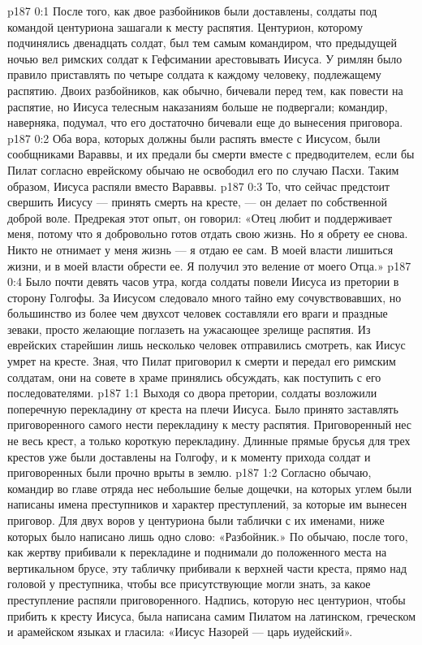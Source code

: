 \author{Комиссия срединников}
\vs p187 0:1 После того, как двое разбойников были доставлены, солдаты под командой центуриона зашагали к месту распятия. Центурион, которому подчинялись двенадцать солдат, был тем самым командиром, что предыдущей ночью вел римских солдат к Гефсимании арестовывать Иисуса. У римлян было правило приставлять по четыре солдата к каждому человеку, подлежащему распятию. Двоих разбойников, как обычно, бичевали перед тем, как повести на распятие, но Иисуса телесным наказаниям больше не подвергали; командир, наверняка, подумал, что его достаточно бичевали еще до вынесения приговора.
\vs p187 0:2 Оба вора, которых должны были распять вместе с Иисусом, были сообщниками Вараввы, и их предали бы смерти вместе с предводителем, если бы Пилат согласно еврейскому обычаю не освободил его по случаю Пасхи. Таким образом, Иисуса распяли вместо Вараввы.
\vs p187 0:3 То, что сейчас предстоит свершить Иисусу --- принять смерть на кресте, --- он делает по собственной доброй воле. Предрекая этот опыт, он говорил: «Отец любит и поддерживает меня, потому что я добровольно готов отдать свою жизнь. Но я обрету ее снова. Никто не отнимает у меня жизнь --- я отдаю ее сам. В моей власти лишиться жизни, и в моей власти обрести ее. Я получил это веление от моего Отца.»
\vs p187 0:4 Было почти девять часов утра, когда солдаты повели Иисуса из претории в сторону Голгофы. За Иисусом следовало много тайно ему сочувствовавших, но большинство из более чем двухсот человек составляли его враги и праздные зеваки, просто желающие поглазеть на ужасающее зрелище распятия. Из еврейских старейшин лишь несколько человек отправились смотреть, как Иисус умрет на кресте. Зная, что Пилат приговорил к смерти и передал его римским солдатам, они на совете в храме принялись обсуждать, как поступить с его последователями.
\vs p187 1:1 Выходя со двора претории, солдаты возложили поперечную перекладину от креста на плечи Иисуса. Было принято заставлять приговоренного самого нести перекладину к месту распятия. Приговоренный нес не весь крест, а только короткую перекладину. Длинные прямые брусья для трех крестов уже были доставлены на Голгофу, и к моменту прихода солдат и приговоренных были прочно врыты в землю.
\vs p187 1:2 Согласно обычаю, командир во главе отряда нес небольшие белые дощечки, на которых углем были написаны имена преступников и характер преступлений, за которые им вынесен приговор. Для двух воров у центуриона были таблички с их именами, ниже которых было написано лишь одно слово: «Разбойник.» По обычаю, после того, как жертву прибивали к перекладине и поднимали до положенного места на вертикальном брусе, эту табличку прибивали к верхней части креста, прямо над головой у преступника, чтобы все присутствующие могли знать, за какое преступление распяли приговоренного. Надпись, которую нес центурион, чтобы прибить к кресту Иисуса, была написана самим Пилатом на латинском, греческом и арамейском языках и гласила: «Иисус Назорей --- царь иудейский».
